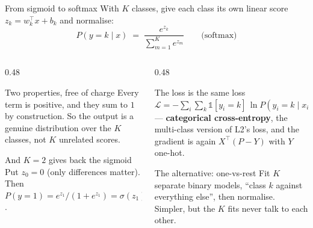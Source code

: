 \documentclass[aspectratio=169]{beamer}
\begin{document}
\begin{frame}[shrink=6]{From sigmoid to softmax}
  With $K$ classes, give each class its own linear score
  $z_k = w_k^{\!\top}x + b_k$ and normalise:
  \[
    P(y = k \mid x) \;=\; \frac{e^{z_k}}{\sum_{m=1}^{K} e^{z_m}}
    \qquad\text{(softmax)}
  \]
  \begin{columns}[T]
    \begin{column}{0.48\textwidth}
      \begin{block}{Two properties, free of charge}
        \small Every term is positive, and they sum to $1$ by
        construction. So the output is a genuine distribution over the $K$
        classes, not $K$ unrelated scores.
      \end{block}
      \begin{block}{And $K = 2$ gives back the sigmoid}
        \small Put $z_0 = 0$ (only differences matter). Then
        $P(y=1) = e^{z_1}/(1+e^{z_1}) = \sigma(z_1)$.
      \end{block}
    \end{column}
    \begin{column}{0.48\textwidth}
      \begin{exampleblock}{The loss is the same loss}
        \small
        $\displaystyle \mathcal{L} = -\sum_i \sum_k
          \mathbb{1}[y_i = k]\,\ln P(y_i = k \mid x_i)$ ---
        \textbf{categorical cross-entropy}, the multi-class version of L2's
        loss, and the gradient is again $X^{\!\top}(P - Y)$ with $Y$
        one-hot.
      \end{exampleblock}
      \begin{alertblock}{The alternative: one-vs-rest}
        \small Fit $K$ separate binary models, ``class $k$ against
        everything else'', then normalise. Simpler, but the $K$ fits never
        talk to each other.
      \end{alertblock}
    \end{column}
  \end{columns}
\end{frame}
\end{document}
